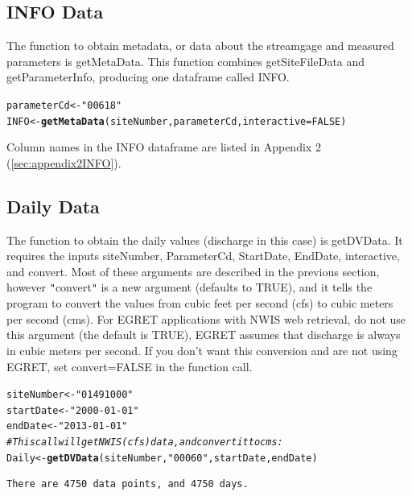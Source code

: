 \documentclass[a4paper,11pt]{article}\usepackage[]{graphicx}\usepackage[]{color}
\makeatletter
\newcommand{\hlnum}[1]{\textcolor[rgb]{0.686,0.059,0.569}{#1}}%
\newcommand{\hlstr}[1]{\textcolor[rgb]{0.192,0.494,0.8}{#1}}%
\newcommand{\hlcom}[1]{\textcolor[rgb]{0.678,0.584,0.686}{\textit{#1}}}%
\newcommand{\hlstd}[1]{\textcolor[rgb]{0.345,0.345,0.345}{#1}}%
\newcommand{\hlkwb}[1]{\textcolor[rgb]{0.69,0.353,0.396}{#1}}%
\newcommand{\hlkwc}[1]{\textcolor[rgb]{0.333,0.667,0.333}{#1}}%
\newcommand{\hlkwd}[1]{\textcolor[rgb]{0.737,0.353,0.396}{\textbf{#1}}}%
\newenvironment{kframe}{%
 \def\at@end@of@kframe{}%
 \ifinner\ifhmode%
  \def\at@end@of@kframe{\end{minipage}}%
  \begin{minipage}{\columnwidth}%
 \fi\fi%
 \def\FrameCommand##1{\hskip\@totalleftmargin \hskip-\fboxsep
 \colorbox{shadecolor}{##1}\hskip-\fboxsep
     \hskip-\linewidth \hskip-\@totalleftmargin \hskip\columnwidth}%
 \MakeFramed {\advance\hsize-\width
   \@totalleftmargin\z@ \linewidth\hsize
   \@setminipage}}%
 {\par\unskip\endMakeFramed%
 \at@end@of@kframe}
\newenvironment{knitrout}{}{} %
\makeatother
\begin{document}
\subsection{INFO Data}
The function to obtain metadata, or data about the streamgage and measured parameters is getMetaData. This function combines getSiteFileData and getParameterInfo, producing one dataframe called INFO.

\begin{knitrout}
\color{fgcolor}\begin{kframe}
\begin{alltt}
\hlstd{parameterCd} \hlkwb{<-} \hlstr{"00618"}
\hlstd{INFO} \hlkwb{<-}\hlkwd{getMetaData}\hlstd{(siteNumber,parameterCd,} \hlkwc{interactive}\hlstd{=}\hlnum{FALSE}\hlstd{)}
\end{alltt}
\end{kframe}
\end{knitrout}


Column names in the INFO dataframe are listed in Appendix 2 (\ref{sec:appendix2INFO}).

\FloatBarrier

\subsection{Daily Data}
The function to obtain the daily values (discharge in this case) is getDVData.  It requires the inputs siteNumber, ParameterCd, StartDate, EndDate, interactive, and convert. Most of these arguments are described in the previous section, however \texttt{"}convert\texttt{"} is a new argument (defaults to TRUE), and it tells the program to convert the values from cubic feet per second (cfs) to cubic meters per second (cms). For EGRET applications with NWIS web retrieval, do not use this argument (the default is TRUE), EGRET assumes that discharge is always in cubic meters per second. If you don't want this conversion and are not using EGRET, set convert=FALSE in the function call. 

\begin{knitrout}
\color{fgcolor}\begin{kframe}
\begin{alltt}
\hlstd{siteNumber} \hlkwb{<-} \hlstr{"01491000"}
\hlstd{startDate} \hlkwb{<-} \hlstr{"2000-01-01"}
\hlstd{endDate} \hlkwb{<-} \hlstr{"2013-01-01"}
\hlcom{# This call will get NWIS (cfs) data , and convert it to cms:}
\hlstd{Daily} \hlkwb{<-} \hlkwd{getDVData}\hlstd{(siteNumber,} \hlstr{"00060"}\hlstd{, startDate, endDate)}
\end{alltt}
\begin{verbatim}
There are 4750 data points, and 4750 days.
\end{verbatim}
\end{kframe}
\end{knitrout}
\end{document}
